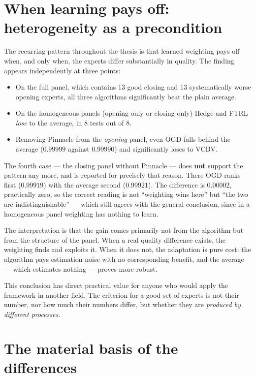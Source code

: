 \documentclass[12pt,a4paper,oneside]{report}
\renewcommand{\_}{\oldunderscore\allowbreak}
\theoremstyle{definition}
\theoremstyle{plain}
\theoremstyle{remark}
\begin{document}
\section{When learning pays off: heterogeneity as a precondition}
\label{sec:disc-hetero}

The recurring pattern throughout the thesis is that learned weighting pays off when, and only
when, the experts differ substantially in quality. The finding appears independently at three
points:

\begin{itemize}
  \item On the full panel, which contains 13 good closing and 13 systematically worse opening
        experts, all three algorithms significantly beat the plain average.
  \item On the homogeneous panels (opening only or closing only) Hedge and FTRL \emph{lose} to
        the average, in 8 tests out of 8.
  \item Removing Pinnacle from the \emph{opening} panel, even OGD falls behind the average
        ($0.99999$ against $0.99990$) and significantly loses to VC\_BV.
\end{itemize}

The fourth case --- the closing panel without Pinnacle --- does \textbf{not} support the pattern
any more, and is reported for precisely that reason. There OGD ranks first ($0.99919$) with the
average second ($0.99921$). The difference is $0.00002$, practically zero, so the correct reading
is not ``weighting wins here'' but ``the two are indistinguishable'' --- which still agrees with
the general conclusion, since in a homogeneous panel weighting has nothing to learn.

The interpretation is that the gain comes primarily not from the algorithm but from the structure
of the panel. When a real quality difference exists, the weighting finds and exploits it. When it
does not, the adaptation is pure cost: the algorithm pays estimation noise with no corresponding
benefit, and the average --- which estimates nothing --- proves more robust.

This conclusion has direct practical value for anyone who would apply the framework in another
field. The criterion for a good set of experts is not their number, nor how much their numbers
differ, but whether they are \emph{produced by different processes}.

\section{The material basis of the differences}
\label{sec:disc-material}
\end{document}
